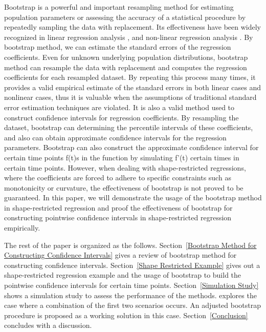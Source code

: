 \documentclass[12pt]{article}
\begin{document}
Bootstrap is a powerful and important resampling method for estimating population parameters or assessing the accuracy of a statistical procedure by repeatedly sampling the data with replacement. Its effectiveness have been widely recognized in linear regression analysis \cite{efron1979bootstrap}, and non-linear regression analysis \cite{davidson1999bootstrap}. By bootstrap method, we can estimate the standard errors of the regression coefficients. Even for unknown underlying population distributions, bootstrap method can resample the data with replacement and computes the regression coefficients for each resampled dataset. \cite{hall2013simple}By repeating this process many times, it provides a valid empirical estimate of the standard errors in both linear cases \cite{efron1985bootstrap} and nonlinear cases\cite{wong2019bootstrap}, thus it is valuable when the assumptions of traditional standard error estimation techniques are violated. It is also a valid method used to construct confidence intervals for regression coefficients. \cite{efron1985bootstrap}By resampling the dataset, bootstrap can determining the percentile intervals of these coefficients, and also can obtain approximate confidence intervals for the regression parameters. \cite{cui2012evaluating} Bootstrap can also construct the approximate confidence interval for certain time points f(t)s in the function by simulating f'(t) certain times in certain time points. \cite{horowitz2018bootstrap} However, when dealing with shape-restricted regressions, where the coefficients are forced to adhere to specific constraints such as monotonicity or curvature, the effectiveness of bootstrap is not proved to be guaranteed. In this paper, we will demonstrate the usage of the bootstrap method in shape-restricted regression and proof the effectiveness of bootstrap for constructing pointwise confidence intervals in shape-restricted regression empirically.

The rest of the paper is organized as the follows. Section~\ref{Bootstrap Method for Constructing Confidence Intervals} gives a review of bootstrap method for constructing confidence intervals. Section~\ref{Shape Restricted Example} gives out a shape-restricted regression example and the usage of bootstrap to build the pointwise confidence intervals for certain time points. Section~\ref{Simulation Study} shows a simulation study to assess the performance of the methods.
explores the case where a combination of the first two scenarios occurs. An  
adjusted bootstrap procedure is proposed as a working solution in this case.  
Section~\ref{Conclusion} concludes with a discussion.
\end{document}
